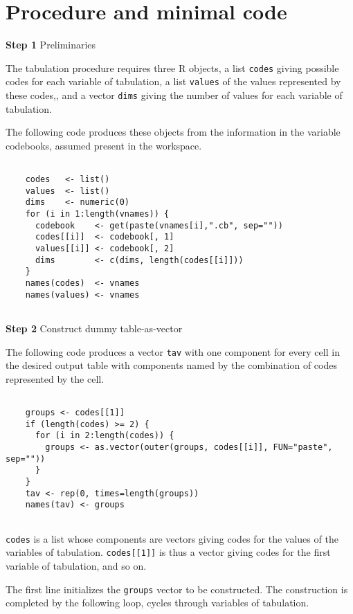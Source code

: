 \section{Procedure and minimal code}

{\bf Step 1} Preliminaries

The tabulation procedure requires three R objects, a list {\tt codes} giving possible codes for each variable of tabulation, a list {\tt values} of the values represented by these codes,, and a vector {\tt dims} giving the number of values for each variable of tabulation.

The following code produces these objects from the information in the variable codebooks, assumed present in the workspace.

\begin{verbatim}

    codes   <- list()
    values  <- list()
    dims    <- numeric(0)
    for (i in 1:length(vnames)) {
      codebook    <- get(paste(vnames[i],".cb", sep=""))
      codes[[i]]  <- codebook[, 1]
      values[[i]] <- codebook[, 2]
      dims        <- c(dims, length(codes[[i]]))
    }
    names(codes)  <- vnames
    names(values) <- vnames
	
\end{verbatim}


\vspace{12pt}
{\bf Step 2} Construct dummy table-as-vector

The following code produces a vector {\tt tav} with one component for every cell in the desired output table with components named by the combination of codes represented by the cell.

\begin{verbatim}

    groups <- codes[[1]]
    if (length(codes) >= 2) {
      for (i in 2:length(codes)) {
        groups <- as.vector(outer(groups, codes[[i]], FUN="paste", sep=""))    
      }
    }
    tav <- rep(0, times=length(groups))
    names(tav) <- groups
	
\end{verbatim}

\texttt{codes} is a list whose components are vectors giving codes for
the values of the variables of tabulation. \texttt{codes{[}{[}1{]}{]}}
is thus a vector giving codes for the first variable of tabulation, and so
on.

The first line initializes the \texttt{groups} vector to be constructed.
The construction is completed by the following loop, cycles through
variables of tabulation.

